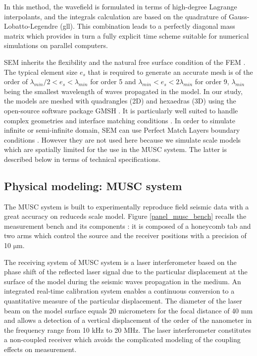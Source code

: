 \documentclass[manuscript,revised]{geophysics}
\begin{document}
\noindent In this method, the wavefield is formulated in terms of high-degree Lagrange interpolants, and the integrals calculation are based on the quadrature of Gauss-Lobatto-Legendre (gll). This combination leads to a perfectly diagonal mass matrix which provides in turn a fully explicit time scheme suitable for numerical simulations on parallel computers.

\noindent SEM inherits the flexibility and the natural free surface condition of the FEM \citep{Tromp_SEM_2008}. The typical element size $e_{s}$ that is required to generate an accurate mesh is of the order of $\lambda_{min} /2 < e_{s} < \lambda_{min}$ for order 5 and $\lambda_{min} < e_{s} < 2\lambda_{min}$ for order 9, $\lambda_{min}$ being the smallest wavelength of waves propagated in the model. In our study, the models are meshed with quadrangles (2D) and hexaedras (3D) using the open-source software package GMSH \citep{Geuzaine_MSH_2009}. It is particularly well suited to handle complex geometries and interface matching conditions \citep{Cristini_SEM_2012}. In order to simulate infinite or semi-infinite domain, SEM can use Perfect Match Layers boundary conditions \citep{Berenger_PML_1994,Festa_PML_2005}. However they are not used here because we simulate scale models which are spatially limited for the use in the MUSC system. The latter is described below in terms of technical specifications.


\subsection{Physical modeling: MUSC system}

\noindent The MUSC system \citep{Bretaudeau_SSA_2008b,Bretaudeau_SSM_2011,Bretaudeau_FWI_2013} is built to experimentally reproduce field seismic data with a great accuracy on reduceds scale model. Figure \ref{panel_musc_bench} recalls the measurement bench and its components : it is composed of a honeycomb tab and two arms which control the source and the receiver positions with a precision of 10 $\mathrm{\mu m}$.

\noindent The receiving system of MUSC system is a laser interferometer based on the phase shift of the reflected laser signal due to the particular displacement at the surface of the model during the seismic waves propagation in the medium. An integrated real-time calibration system enables a continuous conversion to a quantitative measure of the particular displacement. The diameter of the laser beam on the model surface equals 20 micrometers for the focal distance of 40 mm and allows a detection of a vertical displacement of the order of the nanometer in the frequency range from 10 kHz to 20 MHz. The laser interferometer constitutes a non-coupled receiver which avoids the complicated modeling of the coupling effects on measurement.
\end{document}
